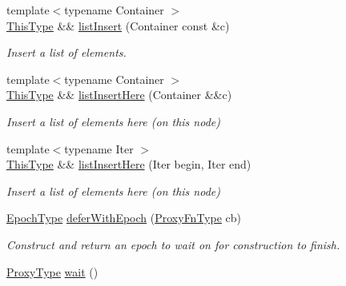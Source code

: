 \begin{DoxyCompactItemize}
{\footnotesize template$<$typename Container $>$ }\\\hyperlink{structvt_1_1vrt_1_1collection_1_1param_1_1_construct_params_a13d4910c0f6825c7b0ddfebce5288bea}{This\+Type} \&\& \hyperlink{structvt_1_1vrt_1_1collection_1_1param_1_1_construct_params_a1eead7ea3a977ef78a82c81da0fb7d65}{list\+Insert} (Container const \&c)
\begin{DoxyCompactList}\small\item\em Insert a list of elements. \end{DoxyCompactList}\item 
{\footnotesize template$<$typename Container $>$ }\\\hyperlink{structvt_1_1vrt_1_1collection_1_1param_1_1_construct_params_a13d4910c0f6825c7b0ddfebce5288bea}{This\+Type} \&\& \hyperlink{structvt_1_1vrt_1_1collection_1_1param_1_1_construct_params_a7e41be76dfbb53f0709983801f7dec83}{list\+Insert\+Here} (Container \&\&c)
\begin{DoxyCompactList}\small\item\em Insert a list of elements here (on this node) \end{DoxyCompactList}\item 
{\footnotesize template$<$typename Iter $>$ }\\\hyperlink{structvt_1_1vrt_1_1collection_1_1param_1_1_construct_params_a13d4910c0f6825c7b0ddfebce5288bea}{This\+Type} \&\& \hyperlink{structvt_1_1vrt_1_1collection_1_1param_1_1_construct_params_a76b651b37044ec8602f04ac97c90035b}{list\+Insert\+Here} (Iter begin, Iter end)
\begin{DoxyCompactList}\small\item\em Insert a list of elements here (on this node) \end{DoxyCompactList}\item 
\hyperlink{namespacevt_a985a5adf291c34a3ca263b3378388236}{Epoch\+Type} \hyperlink{structvt_1_1vrt_1_1collection_1_1param_1_1_construct_params_ae74cccae180eb7f0aedf0650396fb8cc}{defer\+With\+Epoch} (\hyperlink{structvt_1_1vrt_1_1collection_1_1param_1_1_construct_params_ae1b51eac652fafee85f4c370e2c3b585}{Proxy\+Fn\+Type} cb)
\begin{DoxyCompactList}\small\item\em Construct and return an epoch to wait on for construction to finish. \end{DoxyCompactList}\item 
\hyperlink{structvt_1_1vrt_1_1collection_1_1param_1_1_construct_params_a837fb2b2a036f898fb65da72d3ee2fb0}{Proxy\+Type} \hyperlink{structvt_1_1vrt_1_1collection_1_1param_1_1_construct_params_adc5b2150526c86cb3ce556f7cd865a0c}{wait} ()

\end{DoxyCompactItemize}
